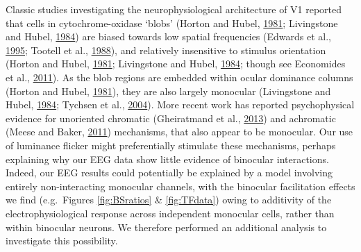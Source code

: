 \documentclass[
]{article}
\begin{document}
Classic studies investigating the neurophysiological architecture of V1 reported that cells in cytochrome-oxidase `blobs' (Horton and Hubel, \protect\hyperlink{ref-Horton1981}{1981}; Livingstone and Hubel, \protect\hyperlink{ref-Livingstone1984}{1984}) are biased towards low spatial frequencies (Edwards et al., \protect\hyperlink{ref-Edwards1995}{1995}; Tootell et al., \protect\hyperlink{ref-Tootell1988}{1988}), and relatively insensitive to stimulus orientation (Horton and Hubel, \protect\hyperlink{ref-Horton1981}{1981}; Livingstone and Hubel, \protect\hyperlink{ref-Livingstone1984}{1984}; though see Economides et al., \protect\hyperlink{ref-Economides2011}{2011}). As the blob regions are embedded within ocular dominance columns (Horton and Hubel, \protect\hyperlink{ref-Horton1981}{1981}), they are also largely monocular (Livingstone and Hubel, \protect\hyperlink{ref-Livingstone1984}{1984}; Tychsen et al., \protect\hyperlink{ref-Tychsen2004}{2004}). More recent work has reported psychophysical evidence for unoriented chromatic (Gheiratmand et al., \protect\hyperlink{ref-Gheiratmand2013}{2013}) and achromatic (Meese and Baker, \protect\hyperlink{ref-Meese2011}{2011}) mechanisms, that also appear to be monocular. Our use of luminance flicker might preferentially stimulate these mechanisms, perhaps explaining why our EEG data show little evidence of binocular interactions. Indeed, our EEG results could potentially be explained by a model involving entirely non-interacting monocular channels, with the binocular facilitation effects we find (e.g.~Figures \ref{fig:BSratios} \& \ref{fig:TFdata}) owing to additivity of the electrophysiological response across independent monocular cells, rather than within binocular neurons. We therefore performed an additional analysis to investigate this possibility.
\end{document}
